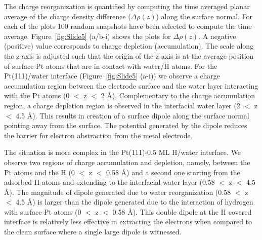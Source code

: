 
The charge reorganization is quantified by computing the
time averaged planar average of the charge density difference 
($\Delta\rho (z)$) along the surface normal. For each of the plots 100
random snapshots have been selected to compute the time average. Figure~\ref{fig:Slide5} (a/b-i) shows the plots for
$\Delta\rho (z)$. A negative (positive) value corresponds to charge 
depletion (accumulation). The scale along the z-axis is adjusted such 
that the origin of the z-axis is at the average position of surface Pt atoms that
are in contact with water/H atoms. 
For the Pt(111)/water interface (Figure~\ref{fig:Slide5} (a-i)) we observe a charge accumulation region between the electrode surface and the water layer interacting with 
the Pt atoms (0 $<$ z $<$ 2 \AA{}). Complementary to the charge accumulation region, a charge depletion region is observed in the interfacial water layer (2 $<$ z $<$ 4.5 \AA). This results in creation of a surface dipole along the surface normal pointing away from the surface. The potential generated by the dipole reduces the barrier for electron abstraction from the metal electrode.  

The situation is more complex in the Pt(111)-0.5 ML H/water interface. We observe two regions of charge accumulation and depletion, namely, between the Pt atoms and the H (0 $<$ z $<$ 0.58 \AA{}) and a second one starting from the adsorbed H atoms and extending to the interfacial water layer (0.58 $<$ z $<$ 4.5 \AA{}). The magnitude of dipole generated due to water reorganization (0.58 $<$ z $<$ 4.5 \AA{}) is larger than the dipole generated due to the interaction of hydrogen with surface Pt atoms (0 $<$ z $<$ 0.58 \AA{}). This double dipole at the H covered interface is relatively less effective in extracting the electrons when compared to the clean surface where a single large dipole is witnessed. 

